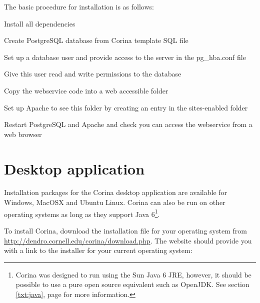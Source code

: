 The basic procedure for installation is as follows:

\begin{itemize*}
 \item Install all dependencies
 \item Create PostgreSQL database from Corina template SQL file
 \item Set up a database user and provide access to the server in the pg\_hba.conf file
 \item Give this user read and write permissions to the database
 \item Copy the webservice code into a web accessible folder
 \item Set up Apache to see this folder by creating an entry in the sites-enabled folder
 \item Restart PostgreSQL and Apache and check you can access the webservice from a web browser
\end{itemize*}




\section{Desktop application}
\label{txt:desktopinstall}
Installation packages for the Corina desktop application are available for Windows, MacOSX and Ubuntu Linux.  Corina can also be run on other operating systems as long as they support Java 6\footnote{Corina was designed to run using the Sun Java 6 JRE, however, it should be possible to use a pure open source equivalent such as OpenJDK.  See section \ref{txt:java}, page \pageref{txt:java} for more information.}.

To install Corina, download the installation file for your operating system from \url{http://dendro.cornell.edu/corina/download.php}. The website should provide you with a link to the installer for your current operating system:

